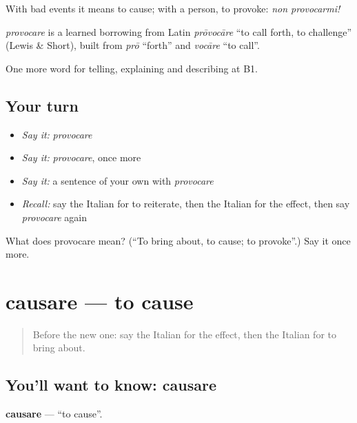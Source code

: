 With bad events it means to cause; with a person, to provoke: \emph{non provocarmi!}

\begin{cousinweb}
\emph{provocare} is a learned borrowing from Latin \emph{prōvocāre} \textquotedblleft{}to call forth, to challenge\textquotedblright{} (Lewis \& Short), built from \emph{prō} \textquotedblleft{}forth\textquotedblright{} and \emph{vocāre} \textquotedblleft{}to call\textquotedblright{}.
\end{cousinweb}

\begin{grammarlens}[title={What you've built}]
One more word for telling, explaining and describing at B1.
\end{grammarlens}

\subsection*{Your turn}
\begin{itemize}
\raggedright
  \item \emph{Say it:} \emph{provocare}
  \item \emph{Say it:} \emph{provocare}, once more
  \item \emph{Say it:} a sentence of your own with \emph{provocare}
  \item \emph{Recall:} say the Italian for to reiterate, then the Italian for the effect, then say \emph{provocare} again
\end{itemize}

\begin{tcolorbox}[breakable,colback=teal!4,colframe=teal!35!black,title={Before you move on}]
What does provocare mean? (\textquotedblleft{}To bring about, to cause; to provoke\textquotedblright{}.) Say it once more.
\end{tcolorbox}
\section[causare]{causare — to cause}

\label{lesson:IT-C349-causare}



\begin{quote}
Before the new one: say the Italian for the effect, then the Italian for to bring about.
\end{quote}

\subsection*{You'll want to know: causare}
\textbf{causare} — \textquotedblleft{}to cause\textquotedblright{}.

